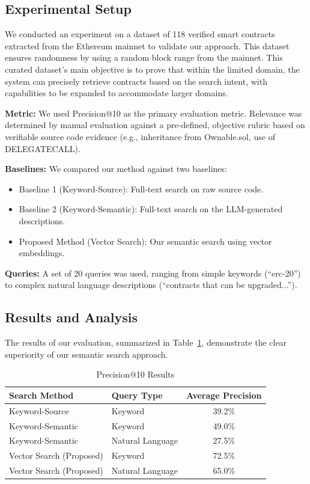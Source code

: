 \subsection{Experimental Setup}
We conducted an experiment on a dataset of 118 verified smart contracts extracted from the Ethereum mainnet to validate our approach. This dataset ensures randomness by using a random block range from the mainnet. This curated dataset's main objective is to prove that within the limited domain, the system can precisely retrieve contracts based on the search intent, with capabilities to be expanded to accommodate larger domains.

\textbf{Metric:} We used Precision@10 as the primary evaluation metric. Relevance was determined by manual evaluation against a pre-defined, objective rubric based on verifiable source code evidence (e.g., inheritance from Ownable.sol, use of DELEGATECALL).

\textbf{Baselines:} We compared our method against two baselines:
\begin{itemize}
	\item Baseline 1 (Keyword-Source): Full-text search on raw source code.
	\item Baseline 2 (Keyword-Semantic): Full-text search on the LLM-generated descriptions.
	\item Proposed Method (Vector Search): Our semantic search using vector embeddings.
\end{itemize}

\textbf{Queries:} A set of 20 queries was used, ranging from simple keywords (``erc-20'') to complex natural language descriptions (``contracts that can be upgraded...'').

\subsection{Results and Analysis}
The results of our evaluation, summarized in Table~\ref{tab:results}, demonstrate the clear superiority of our semantic search approach.

\begin{table}[htbp]
	\caption{Precision@10 Results}\label{tab:results}
	\begin{center}
		\begin{tabular}{l l c}
			\toprule
			\textbf{Search Method}   & \textbf{Query Type} & \textbf{Average Precision} \\
			\midrule
			Keyword-Source           & Keyword             & 39.2\%                     \\
			Keyword-Semantic         & Keyword             & 49.0\%                     \\
			Keyword-Semantic         & Natural Language    & 27.5\%                     \\
			Vector Search (Proposed) & Keyword             & 72.5\%                     \\
			Vector Search (Proposed) & Natural Language    & 65.0\%                     \\
			\bottomrule
		\end{tabular}
	\end{center}
\end{table}

